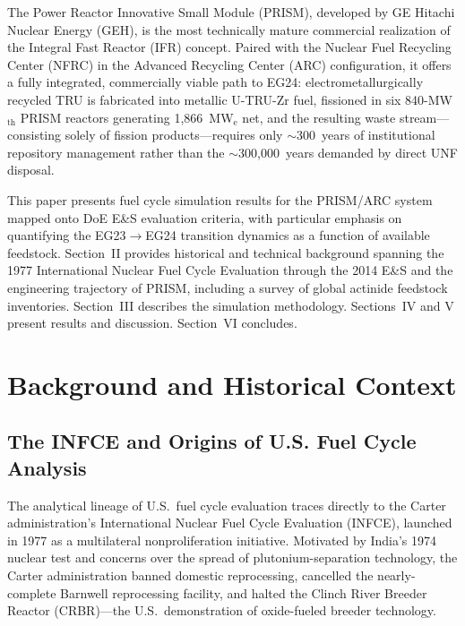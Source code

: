 \documentclass[10pt,twoside]{article}
\begin{document}
The Power Reactor Innovative Small Module
(PRISM), developed by GE Hitachi
Nuclear Energy (GEH), is the most technically mature commercial realization of the
Integral Fast Reactor (IFR) concept.\cite{Triplett2012}  Paired with the Nuclear Fuel
Recycling Center (NFRC) in the Advanced Recycling Center (ARC) configuration,
it offers a fully integrated, commercially viable path to EG24: electrometallurgically
recycled TRU is fabricated into metallic U-TRU-Zr fuel, fissioned in six
840-MW$_\text{th}$ PRISM reactors generating 1{,}866~MW$_\text{e}$ net,
and the resulting waste stream---consisting solely of fission products---requires
only $\sim$300~years of institutional repository management rather than
the $\sim$300{,}000~years demanded by direct UNF disposal.\cite{Triplett2012}

This paper presents fuel cycle simulation results for the PRISM/ARC system
mapped onto DoE E\&S evaluation criteria, with particular emphasis on quantifying
the EG23$\rightarrow$EG24 transition dynamics as a function of available feedstock.
Section~II provides historical and technical background spanning the 1977
International Nuclear Fuel Cycle Evaluation through the 2014 E\&S and the
engineering trajectory of PRISM, including a survey of global actinide feedstock
inventories.  Section~III describes the simulation methodology.  Sections~IV and V
present results and discussion.  Section~VI concludes.

\section{Background and Historical Context}

\subsection{The INFCE and Origins of U.S. Fuel Cycle Analysis}

The analytical lineage of U.S.\ fuel cycle evaluation traces directly to the
Carter administration's International Nuclear Fuel Cycle Evaluation (INFCE),
launched in 1977 as a multilateral nonproliferation initiative.\cite{INFCE1980}
Motivated by India's 1974 nuclear test and concerns over the spread of
plutonium-separation technology, the Carter administration banned domestic
reprocessing, cancelled the nearly-complete Barnwell reprocessing facility,
and halted the Clinch River Breeder Reactor (CRBR)---the U.S.\ demonstration
of oxide-fueled breeder technology.
\end{document}
